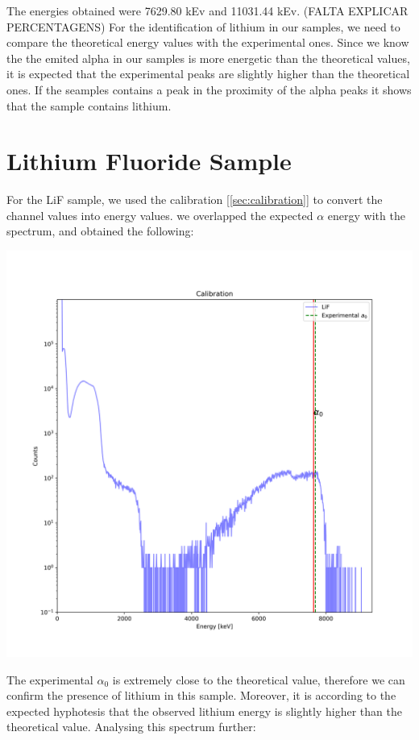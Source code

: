 \documentclass{article}
\begin{document}
\begin{multicols}{2}
The energies obtained were 7629.80 kEv and 11031.44 kEv. (FALTA EXPLICAR PERCENTAGENS)
For the identification of lithium in our samples, we need to compare the theoretical energy values with the experimental ones.
Since we know the the emited alpha in our samples is more energetic than the theoretical values, it is expected that the experimental peaks are slightly higher than the theoretical ones.
If the seamples contains a peak in the proximity of the alpha peaks it shows that the sample contains lithium.

\section{Lithium Fluoride Sample}

For the LiF sample, we used the calibration [\ref*{sec:calibration}] to convert the channel values into energy values.
we overlapped the expected $\alpha$ energy with the spectrum, and obtained the following:

\begin{center}
    \centering
    \includegraphics[scale = 0.35]{../../images/OverlapLiF_NC.png}
\end{center}

The experimental $\alpha_0$ is extremely close to the theoretical value, therefore we can confirm the presence of lithium in this sample. 
Moreover, it is according to the expected hyphotesis that the observed lithium energy is slightly higher than the theoretical value.
Analysing this spectrum further:


\end{multicols}
\end{document}
